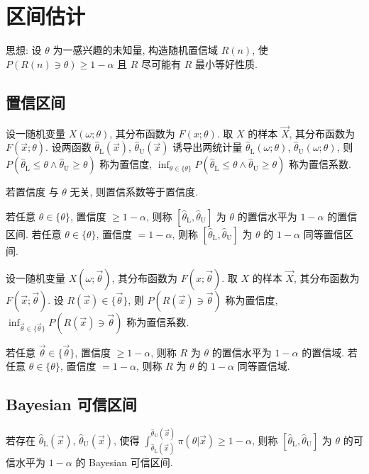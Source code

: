 \chapter{区间估计}

思想: 设 $\theta$ 为一感兴趣的未知量, 构造随机置信域 $R(n)$, 使 $P(R(n)\ni \theta)\ge1-\alpha$ 且 $R$ 尽可能有 $R$ 最小等好性质.

\section{置信区间}

设一随机变量 $X(\omega;\theta)$, 其分布函数为 $F(x;\theta)$. 取 $X$ 的样本 $\vec{X}$, 其分布函数为 $F(\vec{x};\theta)$. 设两函数 $\hat{\theta}_\text{L}(\vec{x})$, $\hat{\theta}_\text{U}(\vec{x})$ 诱导出两统计量 $\hat{\theta}_\text{L}(\omega;\theta)$, $\hat{\theta}_\text{U}(\omega;\theta)$, 则 $P(\hat{\theta}_\text{L}\le\theta\wedge\hat{\theta}_\text{U}\ge\theta)$ 称为置信度, $\inf_{\theta\in\{\theta\}}P(\hat{\theta}_\text{L}\le\theta\wedge\hat{\theta}_\text{U}\ge\theta)$ 称为置信系数.

若置信度 与 $\theta$ 无关, 则置信系数等于置信度.

若任意 $\theta\in\{\theta\}$, 置信度 $\ge1-\alpha$, 则称 $[\hat{\theta}_\text{L},\hat{\theta}_\text{U}]$ 为 $\theta$ 的置信水平为 $1-\alpha$ 的置信区间. 若任意 $\theta\in\{\theta\}$, 置信度 $=1-\alpha$, 则称 $[\hat{\theta}_\text{L},\hat{\theta}_\text{U}]$ 为 $\theta$ 的 $1-\alpha$ 同等置信区间.

设一随机变量 $X(\omega;\vec{\theta})$, 其分布函数为 $F(x;\vec{\theta})$. 取 $X$ 的样本 $\vec{X}$, 其分布函数为 $F(\vec{x};\vec{\theta})$. 设 $R(\vec{x})\in\{\vec{\theta}\}$, 则 $P(R(\vec{x})\ni \vec{\theta})$ 称为置信度, $\inf_{\vec{\theta}\in\{\vec{\theta}\}}P(R(\vec{x})\ni \vec{\theta})$ 称为置信系数.

若任意 $\vec{\theta}\in\{\vec{\theta}\}$, 置信度 $\ge1-\alpha$, 则称 $R$ 为 $\theta$ 的置信水平为 $1-\alpha$ 的置信域. 若任意 $\theta\in\{\theta\}$, 置信度 $=1-\alpha$, 则称 $R$ 为 $\theta$ 的 $1-\alpha$ 同等置信域.

\section{Bayesian 可信区间}

若存在 $\hat{\theta}_\text{L}(\vec{x})$, $\hat{\theta}_\text{U}(\vec{x})$, 使得 $\int_{\hat{\theta}_\text{L}(\vec{x})}^{\hat{\theta}_\text{U}(\vec{x})}\pi(\theta|\vec{x})\ge1-\alpha$, 则称 $[\hat{\theta}_\text{L},\hat{\theta}_\text{U}]$ 为 $\theta$ 的可信水平为 $1-\alpha$ 的 Bayesian 可信区间.

